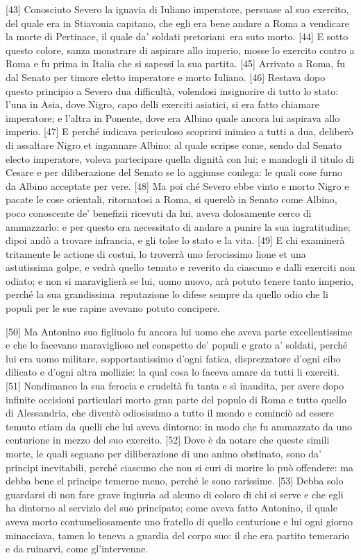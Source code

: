 {[}43{]} Conosciuto Severo la ignavia di Iuliano imperatore, persuase al
suo exercito, del quale era in Stiavonia capitano, che egli era bene
andare a Roma a vendicare la morte di Pertinace, il quale da' soldati
pretoriani\est\ era suto morto. {[}44{]} E sotto questo colore, sanza
monstrare di aspirare allo imperio, mosse lo exercito contro a Roma e fu
prima in Italia che si sapessi la sua partita. {[}45{]} Arrivato a Roma,
fu dal Senato per timore eletto imperatore e morto Iuliano. {[}46{]}
Restava dopo questo principio a Severo dua difficultà, volendosi
insignorire di tutto lo stato: l'una in Asia, dove Nigro, capo delli
exerciti asiatici, si era fatto chiamare imperatore; e l'altra in
Ponente, dove era Albino quale ancora lui aspirava allo imperio.
{[}47{]} E perché iudicava periculoso scoprirsi inimico a tutti a dua,
deliberò di assaltare Nigro et ingannare Albino: al quale scripse come,
sendo dal Senato electo imperatore, voleva partecipare quella dignità
con lui; e mandogli il titulo di Cesare e per diliberazione del Senato
se lo aggiunse conlega: le quali cose furno da Albino acceptate per
vere. {[}48{]} Ma poi ché Severo ebbe vinto e morto Nigro e pacate le
cose orientali, ritornatosi a Roma, si querelò in Senato come Albino,
poco conoscente de' benefizii ricevuti da lui, aveva dolosamente cerco
di ammazzarlo: e per questo era necessitato di andare a punire la sua
ingratitudine; dipoi andò a trovare infrancia, e gli tolse lo stato e la
vita. {[}49{]} E chi examinerà tritamente le actione di costui, lo
troverrà uno ferocissimo lione et una astutissima golpe, e vedrà quello
temuto e reverito da ciascuno e dalli exerciti non odiato; e non si
maraviglierà se lui, uomo nuovo, arà potuto tenere tanto imperio, perché
la sua grandissima\est\ reputazione lo difese sempre da quello odio che li
populi per le sue rapine avevano potuto concipere.

{[}50{]} Ma Antonino suo figliuolo fu ancora lui uomo che aveva parte
excellentissime e che lo facevano maraviglioso nel conspetto de' populi
e grato a' soldati, perché lui era uomo militare, sopportantissimo
d'ogni fatica, disprezzatore d'ogni cibo dilicato e d'ogni altra
mollizie: la qual cosa lo faceva amare da tutti li exerciti. {[}51{]}
Nondimanco la sua ferocia e crudeltà fu tanta e sì inaudita, per avere
dopo infinite occisioni particulari morto gran parte del populo di Roma
e tutto quello di Alessandria, che diventò odiosissimo a tutto il mondo
e cominciò ad essere temuto etiam da quelli che lui aveva dintorno: in
modo che fu ammazzato da uno centurione in mezzo del suo exercito.
{[}52{]} Dove è da notare che queste simili morte, le quali seguano per
diliberazione di uno animo obstinato, sono da' principi inevitabili,
perché ciascuno che non si curi di morire lo può offendere: ma debba
bene el principe temerne meno, perché le sono rarissime. {[}53{]} Debba
solo guardarsi di non fare grave ingiuria ad alcuno di coloro di chi si
serve e che egli ha dintorno al servizio del suo principato; come aveva
fatto Antonino, il quale aveva morto contumeliosamente uno fratello di
quello centurione e lui ogni giorno minacciava, tamen lo teneva a
guardia del corpo suo: il che era partito temerario e da ruinarvi, come
gl'intervenne.

